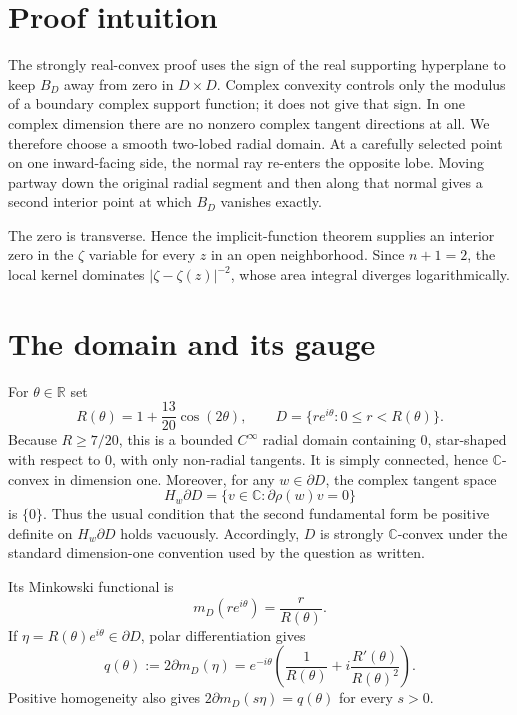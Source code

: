 \documentclass[11pt]{article}
\newcommand{\C}{\mathbb C}
\newcommand{\R}{\mathbb R}
\begin{document}
\section{Proof intuition}

The strongly real-convex proof uses the sign of the real supporting
hyperplane to keep $B_D$ away from zero in $D\times D$.  Complex convexity
controls only the modulus of a boundary complex support function; it does not
give that sign.  In one complex dimension there are no nonzero complex
tangent directions at all.  We therefore choose a smooth two-lobed radial
domain.  At a carefully selected point on one inward-facing side, the normal
ray re-enters the opposite lobe.  Moving partway down the original radial
segment and then along that normal gives a second interior point at which
$B_D$ vanishes exactly.

The zero is transverse.  Hence the implicit-function theorem supplies an
interior zero in the $\zeta$ variable for every $z$ in an open neighborhood.
Since $n+1=2$, the local kernel dominates $|\zeta-\zeta(z)|^{-2}$, whose area
integral diverges logarithmically.

\section{The domain and its gauge}

For $\theta\in\R$ set
\begin{equation}\label{eq:R}
 R(\theta)=1+\frac{13}{20}\cos(2\theta),
 \qquad
 D=\{re^{i\theta}:0\le r<R(\theta)\}.
\end{equation}
Because $R\ge7/20$, this is a bounded $C^\infty$ radial domain containing
$0$, star-shaped with respect to $0$, with only non-radial tangents.  It is
simply connected, hence $\C$-convex in dimension one.  Moreover, for any
$w\in\partial D$, the complex tangent space
\[
 H_w\partial D=\{v\in\C:\partial\rho(w)v=0\}
\]
is $\{0\}$.  Thus the usual condition that the second fundamental form be
positive definite on $H_w\partial D$ holds vacuously.  Accordingly, $D$ is
strongly $\C$-convex under the standard dimension-one convention used by the
question as written.

Its Minkowski functional is
\begin{equation}\label{eq:gauge}
 m_D(re^{i\theta})=\frac r{R(\theta)}.
\end{equation}
If $\eta=R(\theta)e^{i\theta}\in\partial D$, polar differentiation gives
\begin{equation}\label{eq:q}
 q(\theta):=2\partial m_D(\eta)
 =e^{-i\theta}\left(\frac1{R(\theta)}
             +i\frac{R'(\theta)}{R(\theta)^2}\right).
\end{equation}
Positive homogeneity also gives
$2\partial m_D(s\eta)=q(\theta)$ for every $s>0$.
\end{document}
